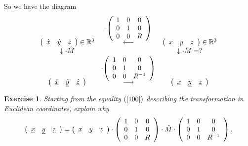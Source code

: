 \documentclass{article}%
\newtheorem{exercise}[theorem]{Exercise}
\begin{document}
So we have the diagram%
\[%
\begin{array}
[c]{ccc}%
\left(
\begin{array}
[c]{ccc}%
\hat{x} & \hat{y} & \hat{z}%
\end{array}
\right)  \in\mathbb{R}^{3} & \overset{\cdot\left(
\begin{array}
[c]{ccc}%
1 & 0 & 0\\
0 & 1 & 0\\
0 & 0 & R
\end{array}
\right)  }{\longleftarrow} & \left(
\begin{array}
[c]{ccc}%
x & y & z
\end{array}
\right)  \in\mathbb{R}^{3}\\
\downarrow\cdot\hat{M} &  & \downarrow\cdot M=?\\
\left(
\begin{array}
[c]{ccc}%
\underline{\hat{x}} & \underline{\hat{y}} & \underline{\hat{z}}%
\end{array}
\right)  & \overset{\cdot\left(
\begin{array}
[c]{ccc}%
1 & 0 & 0\\
0 & 1 & 0\\
0 & 0 & R^{-1}%
\end{array}
\right)  }{\longrightarrow} & \left(
\begin{array}
[c]{ccc}%
\underline{x} & \underline{y} & \underline{z}%
\end{array}
\right)
\end{array}
\]


\begin{exercise}
Starting from the equality $\left(  \ref{100}\right)  $ describing the
transformation in Euclidean coordinates, explain why%
\[
\left(
\begin{array}
[c]{ccc}%
\underline{x} & \underline{y} & \underline{z}%
\end{array}
\right)  =\left(
\begin{array}
[c]{ccc}%
x & y & z
\end{array}
\right)  \cdot\left(
\begin{array}
[c]{ccc}%
1 & 0 & 0\\
0 & 1 & 0\\
0 & 0 & R
\end{array}
\right)  \cdot\hat{M}\cdot\left(
\begin{array}
[c]{ccc}%
1 & 0 & 0\\
0 & 1 & 0\\
0 & 0 & R^{-1}%
\end{array}
\right)  .
\]

\end{exercise}
\end{document}
